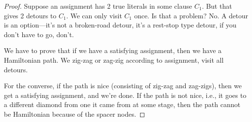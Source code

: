 \begin{proof}
Suppose an assignment has 2 true literals in some clause $C_1$. %
But that gives 2 detours to $C_1$. We can only visit $C_1$ once. Is that a problem? No. 
A detour is an option---it's not a broken-road detour, it's a rest-stop type detour, if you don't have to go, don't.

We have to prove that if we have a satisfying assignment, then we have a Hamiltonian path. We zig-zag or zag-zig according to assignment, visit all detours.

For the converse, if the path is nice (consisting of zig-zag and zag-zigs), then we get a satisfying assignment, and we're done. If the path is not nice, i.e., it goes to a different diamond from one it came from at some stage, then the path cannot be Hamiltonian because of the spacer nodes.
\end{proof}